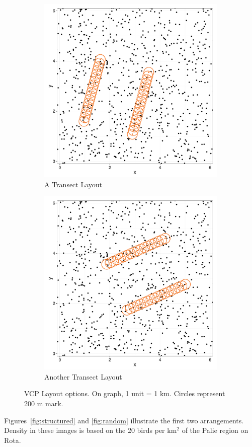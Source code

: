 \documentclass[12pt]{article}
\begin{document}
\begin{figure}
	\begin{subfigure}[b]{0.45\textwidth}
		\includegraphics[width=\textwidth]{../images/layout_rand-sys-4.pdf}
		\caption{A Transect Layout}
		\label{fig:transect1}
	\end{subfigure}
	\begin{subfigure}[b]{0.45\textwidth}
		\includegraphics[width=\textwidth]{../images/layout_rand-sys-6.pdf}
		\caption{Another Transect Layout}
		\label{fig:transect2}
	\end{subfigure}
	\caption{VCP Layout options. On graph, 1 unit = 1 km. Circles represent 200 m mark.}
	\label{fig:layouts}
\end{figure}
Figures~\ref{fig:structured} and \ref{fig:random} illustrate the first two arrangements. Density in these images is based on the 20 birds per km$^2$ of the Palie region on Rota. 
\end{document}
